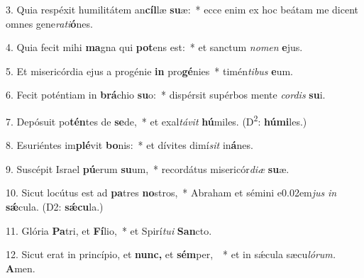 \item 3. Quia respéxit humilitátem an\textbf{cíl}læ \textbf{su}æ:~* ecce enim ex hoc beátam me dicent omnes gene\textit{rati}\textbf{ó}nes.

\item 4. Quia fecit mihi \textbf{ma}gna qui \textbf{pot}ens est:~* et sanctum \textit{nomen} \textbf{e}jus.

\item 5. Et misericórdia ejus a progénie \textbf{in} pro\textbf{gé}nies~* timén\textit{tibus} \textbf{e}um.

\item 6. Fecit poténtiam in \textbf{brá}chio \textbf{su}o:~* dispérsit supérbos mente \textit{cordis} \textbf{su}i.

\item 7. Depósuit po\textbf{tén}tes de \textbf{se}de,~* et exal\textit{távit} \textbf{hú}miles. (D\textsuperscript{2}: \textbf{húmi}les.)

\item 8. Esuriéntes im\textbf{plé}vit \textbf{bo}nis:~* et dívites dimí\hspace{0.02em}\textit{sit} in\textbf{á}nes.

\item 9. Suscépit Israel \textbf{pú}erum \textbf{su}um,~* recordátus misericór\textit{diæ} \textbf{su}æ.

\item 10. Sicut locútus est ad \textbf{pa}tres \textbf{no}stros,~* Abraham et sémini e\kern 0.02em\textit{jus} \textit{in} \textbf{sǽ}cula. (D2: \textbf{sǽcu}la.)

\item 11. Glória \textbf{Pa}tri, et \textbf{Fí}lio,~* et Spirí\hspace{0.03em}\textit{tui} \textbf{San}cto.

\item 12. Sicut erat in princípio, et \textbf{nunc,} et \textbf{sém}per, ~* et in sǽcula sæcu\hspace{0.03em}\textit{lórum.} \textbf{A}men.